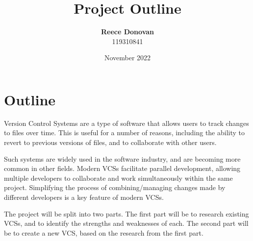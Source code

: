 \documentclass[a4paper,12pt]{article}
\begin{document}
\title{Project Outline}
\date{November 2022}
\author{\textbf{Reece Donovan}
    \\
    \small{119310841}
}
\maketitle
\thispagestyle{empty}
\section*{Outline}
Version Control Systems are a type of software that allows users to track changes to files over time\@. This is useful for a number of reasons, including the ability to revert to previous versions of files, and to collaborate with other users\cite{zolkifli_ngah_deraman_2018}.

Such systems are widely used in the software industry, and are becoming more common in other fields\@. Modern VCSs facilitate parallel development, allowing multiple developers to collaborate and work simultaneously within the same project\@. Simplifying the process of combining/managing changes made by different developers is a key feature of modern VCSs\@.

The project will be split into two parts\@. The first part will be to research existing VCSs, and to identify the strengths and weaknesses of each\@. The second part will be to create a new VCS, based on the research from the first part\@.
\end{document}
